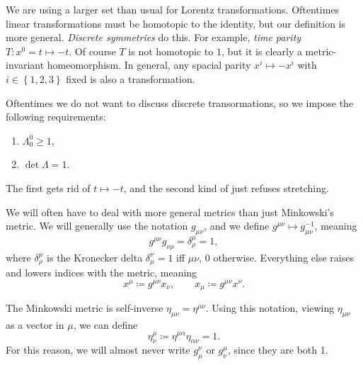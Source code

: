 We are using a larger set than usual for Lorentz transformations. Oftentimes linear transformations must be homotopic to the identity, but our definition is more general. \emph{Discrete symmetries} do this. For example, \emph{time parity} $T : x^0 = t \mapsto -t$. Of course $T$ is not homotopic to $1$, but it is clearly a metric-invariant homeomorphism. In general, any spacial parity $x^i \mapsto -x^i$ with $i\in \left\{ 1,2,3 \right\} $ fixed is also a transformation.

Oftentimes we do not want to discuss discrete transormations, so we impose the following requirements:

\begin{enumerate}
	\item $\Lambda _0^0\geq 1$,
	\item $\det \Lambda =1$.
\end{enumerate}
The first gets rid of $t\mapsto -t$, and the second kind of just refuses stretching.

\begin{notation}\label{1.5}
	We will often have to deal with more general metrics than just Minkowski's metric. We will generally use the notation $g_{\mu \nu } $, and we define $g^{\mu \nu } \mapsto g_{\mu \nu } ^{-1} $, meaning
	\[
		g^{\mu \nu } g_{\nu \rho } =\delta_\rho^\mu =1,
	\]
	where $\delta_\rho^\mu $ is the Kronecker delta $\delta_{\mu }^\nu =1$ iff $\mu \nu $, 0 otherwise. Everything else raises and lowers indices with the metric, meaning
	\[
		x^\mu \coloneqq g^{\mu \nu } x_\nu ,\qquad x_\mu \coloneqq g^{\mu \nu } x^\nu 
	.\]
\end{notation}

The Minkowski metric is self-inverse $\eta_{\mu \nu } =\eta ^{\mu \nu } $. Using this notation, viewing $\eta_{\mu \nu } $ as a vector in $\mu $, we can define
\[
	\eta^\mu _\nu  \coloneqq \eta ^{\mu \alpha }\eta _{\alpha \nu } =1
.\]
For this reason, we will almost never write $g_\mu ^\nu $ or $g_\nu ^\mu $, since they are both 1.
